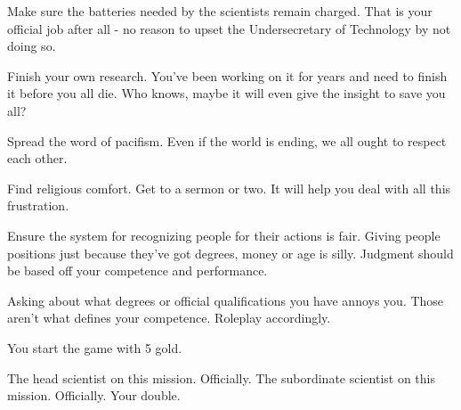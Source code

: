 \documentclass[char]{guildcamp3}
\begin{document}
\begin{itemz}[Goals]
  \item Make sure the batteries needed by the scientists remain charged. That is your official job after all - no reason to upset the Undersecretary of Technology by not doing so. 
  \item Finish your own research. You've been working on it for years and need to finish it before you all die. Who knows, maybe it will even give the insight to save you all?
  \item Spread the word of pacifism. Even if the world is ending, we all ought to respect each other.
  \item Find religious comfort. Get to a sermon or two. It will help you deal with all this frustration.
  \item Ensure the system for recognizing people for their actions is fair. Giving people positions just because they've got degrees, money or age is silly. Judgment should be based off your competence and performance. 
\end{itemz}

\begin{itemz}[Notes]
  \item Asking about what degrees or official qualifications you have annoys you. Those aren't what defines your competence. Roleplay accordingly.  
  \item You start the game with 5 gold. 
\end{itemz}


\begin{contacts}
  \contact{\cSciOne{}} The head scientist on this mission. Officially. 
  \contact{\cSciTwo{}} The subordinate scientist on this mission. Officially. 
  \contact{\cServant{}} Your double. 
\end{contacts}
\end{document}
